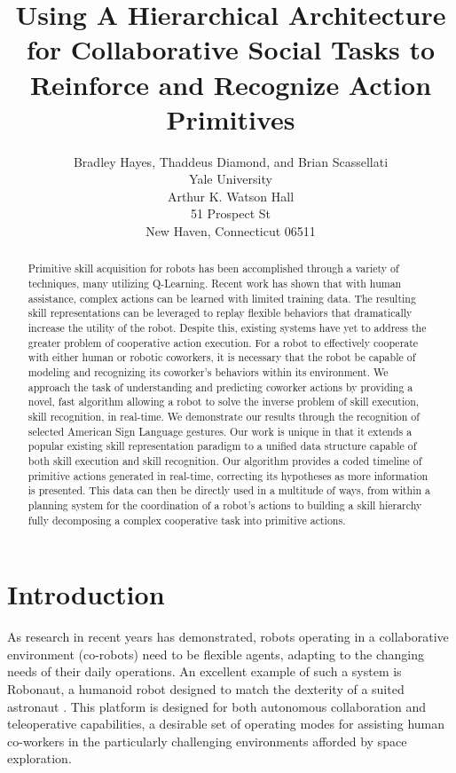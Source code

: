 \documentclass[letterpaper]{article}
\begin{document}
\title{Using A Hierarchical Architecture for Collaborative Social Tasks to Reinforce and Recognize Action Primitives}
\author{Bradley Hayes, Thaddeus Diamond, and Brian Scassellati\\
Yale University\\
Arthur K. Watson Hall\\
51 Prospect St\\
New Haven, Connecticut 06511\\
}

\maketitle

\begin{abstract}
Primitive skill acquisition for robots has been accomplished through a variety
of techniques, many utilizing Q-Learning. Recent work has shown that with human
assistance, complex actions can be learned with limited training data. The
resulting skill representations can be leveraged to replay flexible behaviors
that dramatically increase the utility of the robot. Despite this, existing
systems have yet to address the greater problem of cooperative action execution.
For a robot to effectively cooperate with either human or robotic coworkers,
it is necessary that the robot be capable of modeling and recognizing its
coworker’s behaviors within its environment. We approach the task of
understanding and predicting coworker actions by providing a novel, fast algorithm
allowing a robot to solve the inverse problem of skill execution, skill
recognition, in real-time. We demonstrate our results through the recognition of selected
American Sign Language gestures. Our work is unique in that it extends a popular existing skill
representation paradigm to a unified data structure capable of both skill execution and skill recognition. 
Our algorithm provides a coded timeline of
primitive actions generated in real-time, correcting its hypotheses as more
information is presented. This data can then be directly used in a multitude
of ways, from within a planning system for the coordination of a robot's
actions to building a skill hierarchy fully decomposing a complex cooperative 
task into primitive actions.
\end{abstract}

\section{Introduction}
\label{sec:intro}
	As research in recent years has demonstrated, robots operating in a collaborative environment (co-robots) need to be flexible agents, adapting to the changing needs of their daily operations. An excellent example of such a system is Robonaut, a humanoid robot designed to match the dexterity of a suited astronaut \cite{Robonaut}. This platform is designed for both autonomous collaboration and teleoperative capabilities, a desirable set of operating modes for assisting human co-workers in the particularly challenging environments afforded by space exploration. 
	
\end{document}
